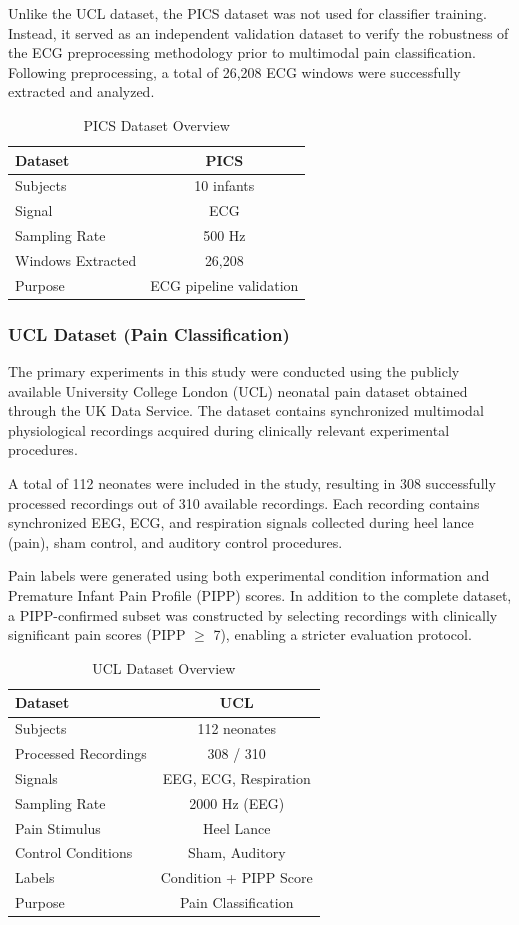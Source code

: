 \documentclass[conference]{IEEEtran}
\begin{document}
Unlike the UCL dataset, the PICS dataset was not used for classifier training. Instead, it served as an independent validation dataset to verify the robustness of the ECG preprocessing methodology prior to multimodal pain classification. Following preprocessing, a total of 26,208 ECG windows were successfully extracted and analyzed.
\begin{table}[ht]
\caption{PICS Dataset Overview}
\centering
\begin{tabular}{|l|c|}
\hline
Dataset & PICS \\
\hline
Subjects & 10 infants \\
Signal & ECG \\
Sampling Rate & 500 Hz \\
Windows Extracted & 26,208 \\
Purpose & ECG pipeline validation \\
\hline
\end{tabular}
\label{tab:pics}
\end{table}

\subsubsection{UCL Dataset (Pain Classification)}

The primary experiments in this study were conducted using the publicly available University College London (UCL) neonatal pain dataset\cite{jones2018ucl} obtained through the UK Data Service. The dataset contains synchronized multimodal physiological recordings acquired during clinically relevant experimental procedures.

A total of 112 neonates were included in the study, resulting in 308 successfully processed recordings out of 310 available recordings. Each recording contains synchronized EEG, ECG, and respiration signals collected during heel lance (pain), sham control, and auditory control procedures.

Pain labels were generated using both experimental condition information and Premature Infant Pain Profile (PIPP) scores. In addition to the complete dataset, a PIPP-confirmed subset was constructed by selecting recordings with clinically significant pain scores (PIPP $\geq$ 7), enabling a stricter evaluation protocol.

\begin{table}[ht]
\caption{UCL Dataset Overview}
\centering
\begin{tabular}{|l|c|}
\hline
Dataset & UCL \\
\hline
Subjects & 112 neonates \\
Processed Recordings & 308 / 310 \\
Signals & EEG, ECG, Respiration \\
Sampling Rate & 2000 Hz (EEG) \\
Pain Stimulus & Heel Lance \\
Control Conditions & Sham, Auditory \\
Labels & Condition + PIPP Score \\
Purpose & Pain Classification \\
\hline
\end{tabular}
\label{tab:ucl}
\end{table}
\end{document}
